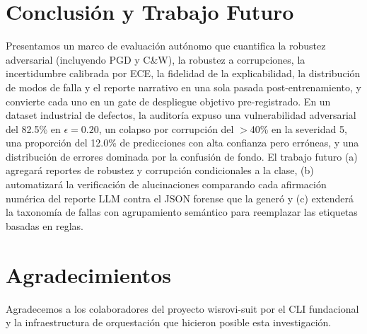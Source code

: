 \documentclass[10pt,twocolumn,letterpaper]{article}
\begin{document}
\section{Conclusión y Trabajo Futuro}
\label{sec:conclusion}
Presentamos un marco de evaluación autónomo que cuantifica la robustez adversarial (incluyendo PGD y C\&W), la robustez a corrupciones, la incertidumbre calibrada por ECE, la fidelidad de la explicabilidad, la distribución de modos de falla y el reporte narrativo en una sola pasada post-entrenamiento, y convierte cada uno en un gate de despliegue objetivo pre-registrado. En un dataset industrial de defectos, la auditoría expuso una vulnerabilidad adversarial del 82.5\% en $\epsilon=0.20$, un colapso por corrupción del $>$40\% en la severidad 5, una proporción del 12.0\% de predicciones con alta confianza pero erróneas, y una distribución de errores dominada por la confusión de fondo. El trabajo futuro (a) agregará reportes de robustez y corrupción condicionales a la clase, (b) automatizará la verificación de alucinaciones comparando cada afirmación numérica del reporte LLM contra el JSON forense que la generó y (c) extenderá la taxonomía de fallas con agrupamiento semántico para reemplazar las etiquetas basadas en reglas.

\section{Agradecimientos}
Agradecemos a los colaboradores del proyecto wisrovi-suit por el CLI fundacional y la infraestructura de orquestación que hicieron posible esta investigación.



\end{document}
